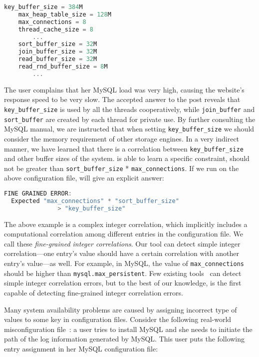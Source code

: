 \begin{lstlisting}[language=C, xleftmargin=.01\textwidth]
    key_buffer_size = 384M
    max_heap_table_size = 128M
    max_connections = 8
    thread_cache_size = 8
        ...
    sort_buffer_size = 32M
    join_buffer_size = 32M
    read_buffer_size = 32M
    read_rnd_buffer_size = 8M
        ...
\end{lstlisting} 

The user complains that her MySQL load was very high, causing the website's response speed to be very slow.
The accepted answer to the post reveals that {\tt key\_buffer\_size} is used by all the threads cooperatively, 
  while {\tt join\_buffer} and {\tt sort\_buffer} are created by each thread for private use.
By further consulting the MySQL manual, we are instructed that when setting {\tt key\_buffer\_size} we should consider the memory requirement of other storage engines.
In a very indirect manner, we have learned that there is a correlation between {\tt key\_buffer\_size} and other buffer sizes of the system.
\app is able to learn a specific constraint,  should not be greater than {\tt sort\_buffer\_size} * {\tt max\_connections}.
If we run \app on the above configuration file, \app will give an explicit answer:

\begin{lstlisting}[language=C, xleftmargin=.01\textwidth]
  FINE GRAINED ERROR:
  Expected "max_connections" * "sort_buffer_size"
               > "key_buffer_size"
\end{lstlisting} 

The above example is a complex integer correlation, which implicitly
includes a computational correlation among different entries
in the configuration file.
We call these {\em fine-grained integer correlations}. 
Our tool can detect simple integer correlation---one entry's
value should have a certain correlation with another entry's 
value---as well.
For example, in MySQL, the value of {\tt max\_connections} 
should be higher than {\tt mysql.max\_persistent}.
Few existing tools~\cite{yin11anempirical, zhang14encore}
can detect simple integer correlation errors,
but to the best of our knowledge, \app is the first capable of
detecting fine-grained integer correlation errors.

Many system availability problems are caused by 
assigning incorrect type of values to some key in configuration
files. Consider the following real-world misconfiguration
file~\cite{typeerror}:
a user tries to install MySQL and she needs to initiate the path
of the log information generated by MySQL.
This user puts the following entry assignment in her MySQL
configuration file: 

